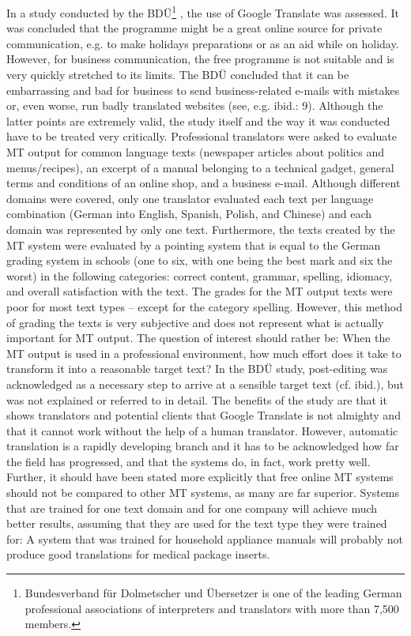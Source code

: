 \documentclass[output=paper]{langsci/langscibook}
\begin{document}
In a study conducted by the BDÜ\footnote{Bundesverband für Dolmetscher und Übersetzer is one of the leading German professional associations of interpreters and translators with more than 7,500 members.} \citep{bdü2012}, the use of Google Translate was assessed. It was concluded that the programme might be a great online source for private communication, e.g. to make holidays preparations or as an aid while on holiday. However, for business communication, the free programme is not suitable and is very quickly stretched to its limits. The BDÜ concluded that it can be embarrassing and bad for business to send business-related e\nobreakdash-mails with mistakes or, even worse, run badly translated websites (see, e.g. ibid.: 9). Although the latter points are extremely valid, the study itself and the way it was conducted have to be treated very critically. Professional translators were asked to evaluate MT output for common language texts (newspaper articles about politics and menus/recipes), an excerpt of a manual belonging to a technical gadget, general terms and conditions of an online shop, and a business e\nobreakdash-mail. Although different domains were covered, only one translator evaluated each text per language combination (German into English, Spanish, Polish, and Chinese) and each domain was represented by only one text. Furthermore, the texts created by the MT system were evaluated by a pointing system that is equal to the German grading system in schools (one to six, with one being the best mark and six the worst) in the following categories: correct content, grammar, spelling, idiomacy, and overall satisfaction with the text. The grades for the MT output texts were poor for most text types -- except for the category spelling. However, this method of grading the texts is very subjective and does not represent what is actually important for MT output. The question of interest should rather be: When the MT output is used in a professional environment, how much effort does it take to transform it into a reasonable target text? In the BDÜ study, post-editing was acknowledged as a necessary step to arrive at a sensible target text (cf. ibid.), but was not explained or referred to in detail. The benefits of the study are that it shows translators and potential clients that Google Translate is not almighty and that it cannot work without the help of a human translator. However, automatic translation is a rapidly developing branch and it has to be acknowledged how far the field has progressed, and that the systems do, in fact, work pretty well. Further, it should have been stated more explicitly that free online MT systems should not be compared to other MT systems, as many are far superior. Systems that are trained for one text domain and for one company will achieve much better results, assuming that they are used for the text type they were trained for: A system that was trained for household appliance manuals will probably not produce good translations for medical package inserts.
\end{document}
